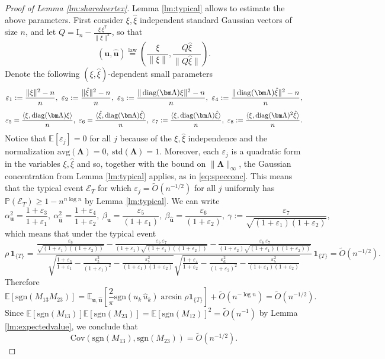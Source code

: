\documentclass[reqno]{amsart}
\numberwithin{equation}{section}
\renewcommand\P{\mathbb{P}}
\newcommand\E{\mathbb{E}}
\newcommand\bu{\bm{u}}
\newcommand\hu{\hat{\bm u}}
\newcommand\eps{\varepsilon}
\newcommand\on[1]{{\mathbf 1}_{\{#1\}}}
\newcommand{\diag}{\mathop {\rm diag}}
\newcommand{\av}{\mathrm{avg}}
\newcommand{\std}{\mathrm{std}}
\newcommand{\Cov}{\mathrm{Cov}}
\begin{document}
\begin{proof}[Proof of Lemma \ref{lm:sharedvertex}]
Lemma \ref{lm:typical} allows to estimate the above parameters. First consider $\xi,\hat{\xi}$ independent standard Gaussian vectors of size $n$, and let $Q=\mathrm{I}_{n}-\frac{\xi\,\xi^{T}}{\|\xi\|^2}$, so that 
\[(\bu,\hu) \stackrel{\mathrm{law}}{=}\left(\frac{\xi}{\|\xi\|},\frac{Q\hat{\xi}}{\|Q\hat{\xi}\|}\right).\]
Denote the following $(\xi,\hat{\xi})$-dependent small parameters $$\eps_{1}:=\frac{\|\xi\|^2-n}{n},\ \eps_{2}:=\frac{\|\hat{\xi}\|^2-n}{n},\ \eps_{3}:=\frac{\|\diag(\bm\Lambda)\xi\|^2-n}{n},\ \eps_{4}:=\frac{\|\diag(\bm\Lambda)\hat{\xi}\|^2-n}{n},$$
$$\eps_{5}=\frac{\langle\xi,\diag(\bm\Lambda)\xi\rangle}{n},\ \eps_{6}=\frac{\langle\hat{\xi},\diag(\bm\Lambda)\hat{\xi}\rangle}{n},\ \eps_{7}:=\frac{\langle\xi,\diag(\bm\Lambda)\hat{\xi}\rangle}{n},\ \eps_{8}:=\frac{\langle\xi,\diag(\bm\Lambda)^2\hat{\xi}\rangle}{n}.$$
Notice that $\E[\eps_{j}]=0$ for all $j$ because of the $\xi,\hat{\xi}$ independence and the normalization $\av(\bm\Lambda)=0,\ \std(\bm\Lambda)=1$. Moreover, each $\eps_j$ is a quadratic form in the variables $\xi,\hat{\xi}$ and so, together with the bound on $\|\bm\Lambda\|_{\infty}$, the Gaussian concentration from Lemma \ref{lm:typical} applies, as in \eqref{eq:specconc}. This means that the typical event $\mathcal{E}_{T}$ for which $\eps_{j}=\tilde{O}(n^{-1/2})$ for all $j$ uniformly has $\P(\mathcal{E}_{T})\ge 1-n^{n\log n}$ by Lemma \ref{lm:typical}. We can write
$$\alpha_{\bu}^2=\frac{1+\eps_3}{1+\eps_1},\  \alpha_{\hu}^2=\frac{1+\eps_4}{1+\eps_2},\ \beta_{\bu}=\frac{\eps_{5}}{(1+\eps_1)},\ \beta_{\hu}=\frac{\eps_{6}}{(1+\eps_2)},\ \gamma:=\frac{\eps_{7}}{\sqrt{(1+\eps_1)(1+\eps_2)}},$$
which means that under the typical event 
$$\rho\, \on{T}=\frac{\frac{\eps_8}{\sqrt{(1+\eps_1)((1+\eps_2))}}-\frac{\eps_5\,\eps_7}{(1+\eps_1)\sqrt{(1+\eps_1)((1+\eps_2))}}-\frac{\eps_6\,\eps_7}{(1+\eps_2)\sqrt{(1+\eps_1)((1+\eps_2))}}}{\sqrt{\frac{1+\eps_3}{1+\eps_1}-\frac{\eps_5^2}{(1+\eps_1)^2}-\frac{\eps_7^2}{(1+\eps_1)(1+\eps_2)}}\sqrt{\frac{1+\eps_4}{1+\eps_2}-\frac{\eps_6^2}{(1+\eps_2)^2}-\frac{\eps_7^2}{(1+\eps_1)(1+\eps_2)}}}\, \on{T}=\tilde{O}(n^{-1/2}).$$
Therefore
\[\E\left[\mathrm{sgn}(M_{13}M_{23})\right]=\E_{\bu,\hu}\left[\frac{2}{\pi}\mathrm{sgn}(u_k\,\hat{u}_k)\arcsin{\rho}\on{T}\right]+\tilde{O}(n^{-\log n})=\tilde{O}(n^{-1/2}).\]
Since $\E\left[\mathrm{sgn}(M_{13})\right]\E\left[\mathrm{sgn}(M_{23})\right]=\E\left[\mathrm{sgn}(M_{12})\right]^2=\tilde{O}(n^{-1})$ by Lemma \ref{lm:expectedvalue}, we conclude that $$\Cov(\mathrm{sgn}(M_{13}),\mathrm{sgn}(M_{23}))=\tilde{O}(n^{-1/2}).$$
\end{proof}
\end{document}

